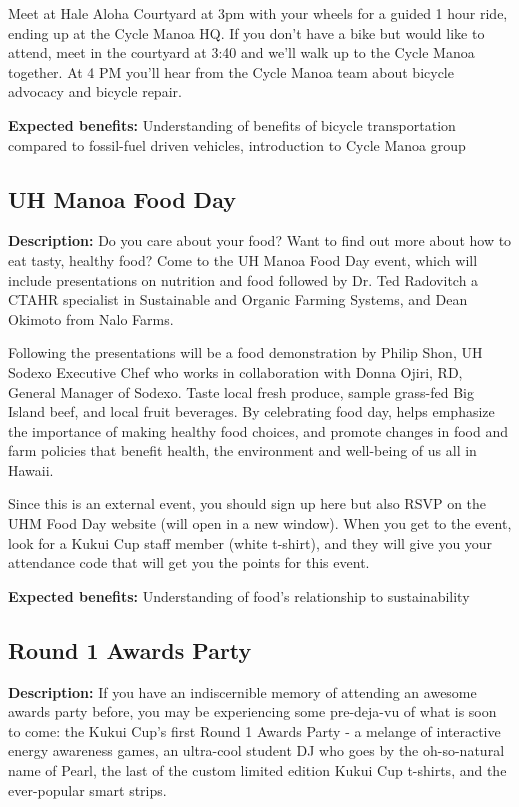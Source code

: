 Meet at Hale Aloha Courtyard at 3pm with your wheels for a guided 1 hour ride, ending up at the Cycle Manoa HQ. If you don't have a bike but would like to attend, meet in the courtyard at 3:40 and we'll walk up to the Cycle Manoa together. At 4 PM you'll hear from the Cycle Manoa team about bicycle advocacy and bicycle repair.

\vspace{2ex}
\textbf{Expected benefits:} Understanding of benefits of bicycle transportation compared to fossil-fuel driven vehicles, introduction to Cycle Manoa group


\subsection{UH Manoa Food Day}

\textbf{Description:} Do you care about your food? Want to find out more about how to eat tasty, healthy food? Come to the UH Manoa Food Day event, which will include presentations on nutrition and food followed by Dr. Ted Radovitch a CTAHR specialist in Sustainable and Organic Farming Systems, and Dean Okimoto from Nalo Farms.

Following the presentations will be a food demonstration by Philip Shon, UH Sodexo Executive Chef who works in collaboration with Donna Ojiri, RD, General Manager of Sodexo. Taste local fresh produce, sample grass-fed Big Island beef, and local fruit beverages. By celebrating food day, helps emphasize the importance of making healthy food choices, and promote changes in food and farm policies that benefit health, the environment and well-being of us all in Hawaii.

Since this is an external event, you should sign up here but also RSVP on the UHM Food Day website (will open in a new window). When you get to the event, look for a Kukui Cup staff member (white t-shirt), and they will give you your attendance code that will get you the points for this event.

\vspace{2ex}
\textbf{Expected benefits:} Understanding of food's relationship to sustainability


\subsection{Round 1 Awards Party}

\textbf{Description:} If you have an indiscernible memory of attending an awesome awards party before, you may be experiencing some pre-deja-vu of what is soon to come: the Kukui Cup's first Round 1 Awards Party - a melange of interactive energy awareness games, an ultra-cool student DJ who goes by the oh-so-natural name of Pearl, the last of the custom limited edition Kukui Cup t-shirts, and the ever-popular smart strips.

